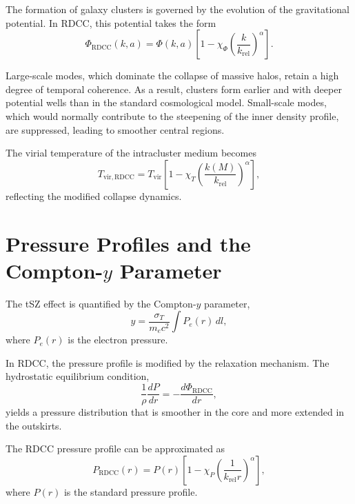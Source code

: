 \documentclass[11pt,a4paper]{article}
\begin{document}
The formation of galaxy clusters is governed by the evolution of the gravitational 
potential. In RDCC, this potential takes the form
\begin{equation}
    \Phi_{\mathrm{RDCC}}(k,a)
    = \Phi(k,a)
      \left[1 - \chi_{\Phi}
      \left(\frac{k}{k_{\mathrm{rel}}}\right)^{\alpha}\right].
\end{equation}

Large-scale modes, which dominate the collapse of massive halos, retain a high 
degree of temporal coherence. As a result, clusters form earlier and with deeper 
potential wells than in the standard cosmological model. Small-scale modes, which 
would normally contribute to the steepening of the inner density profile, are 
suppressed, leading to smoother central regions.

The virial temperature of the intracluster medium becomes
\begin{equation}
    T_{\mathrm{vir,RDCC}}
    = T_{\mathrm{vir}}
      \left[1 - \chi_{T}
      \left(\frac{k(M)}{k_{\mathrm{rel}}}\right)^{\alpha}\right],
\end{equation}
reflecting the modified collapse dynamics.
\section{Pressure Profiles and the Compton-\texorpdfstring{$y$}{y} Parameter}

The tSZ effect is quantified by the Compton-$y$ parameter,
\begin{equation}
    y = \frac{\sigma_{T}}{m_{e} c^{2}}
        \int P_{e}(r)\,dl,
\end{equation}
where $P_{e}(r)$ is the electron pressure.

In RDCC, the pressure profile is modified by the relaxation mechanism. The 
hydrostatic equilibrium condition,
\begin{equation}
    \frac{1}{\rho}\frac{dP}{dr}
    = -\frac{d\Phi_{\mathrm{RDCC}}}{dr},
\end{equation}
yields a pressure distribution that is smoother in the core and more extended in 
the outskirts.

The RDCC pressure profile can be approximated as
\begin{equation}
    P_{\mathrm{RDCC}}(r)
    = P(r)
      \left[
        1 - \chi_{P}
        \left(\frac{1}{k_{\mathrm{rel}} r}\right)^{\alpha}
      \right],
\end{equation}
where $P(r)$ is the standard pressure profile.
\end{document}
